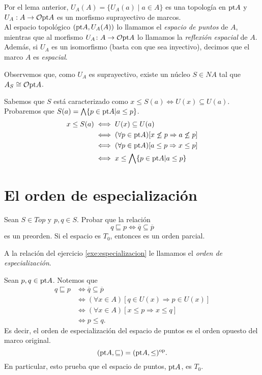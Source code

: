 Por el lema anterior, $U_A(A)=\{U_A(a)\mid a\in A\}$
es una topología en $\mathrm{pt} A$ y $U_A:A\to\mathcal{O}\mathrm{pt} A$ es un morfismo
suprayectivo de marcos.\\
Al espacio topológico $(\mathrm{pt} A,U_A(A))$ lo llamamos
el \textit{espacio de puntos} de $A$,
mientras que al morfismo $U_A\colon A\to \mathcal{O}\mathrm{pt} A$
lo llamamos la \textit{reflexión espacial} de $A$.
Además, si $U_A$ es un isomorfismo (basta con que sea inyectivo),
decimos que el marco $A$ es \textit{espacial}.

Observemos que, como $U_A$ es suprayectivo,
existe un núcleo $S\in NA$ tal que $A_S\cong \mathcal{O}\mathrm{pt} A$.\par
Sabemos que $S$ está caracterizado como $x\leq S(a) \iff U(x)\subseteq U(a)$. Probaremos que $S(a)=\bigwedge \{p\in \mathrm{pt} A|a\leq p\}$.
\begin{align*}
    x\leq S(a) &\iff U(x)\subseteq U(a)\\
    &\iff (\forall p\in \mathrm{pt} A)[x\not\leq p\Rightarrow a\not\leq p]\\
    &\iff (\forall p\in \mathrm{pt} A)[a\leq p \Rightarrow x\leq p]\\
    &\iff x\leq \bigwedge \{p\in \mathrm{pt} A|a\leq p\}
\end{align*}

\section{El orden de especialización}
\begin{exe}%
    \label{exe:especializacion}
  Sean $S\in Top$ y $p,q\in S$. Probar que la relación
  \[q\sqsubseteq p\iff \overline{q}\subseteq \overline{p}\]
  es un preorden. Si el espacio es $T_0$, entonces es un orden parcial.
\end{exe}
A la relación del ejercicio \ref{exe:especializacion}
le llamamos el \textit{orden de especialización}.\par 
Sean $p,q\in \mathrm{pt} A$. Notemos que
\begin{align*}
    q\sqsubseteq p&\iff \overline{q}\subseteq \overline{p}\\
    &\iff (\forall x\in A)[q\in U(x)\Rightarrow p\in U(x)]\\
    &\iff (\forall x\in A)[x\leq p\Rightarrow x\leq q]\\
    &\iff p\leq q.
\end{align*}
Es decir, el orden de especialización del espacio de puntos es el orden opuesto del marco original.
\[
    (\mathrm{pt} A,\sqsubseteq) = (\mathrm{pt} A,\leq)^{\mathrm{op}}.
\]
En particular, esto prueba que el espacio de puntos, $\mathrm{pt} A$, es $T_0$.

